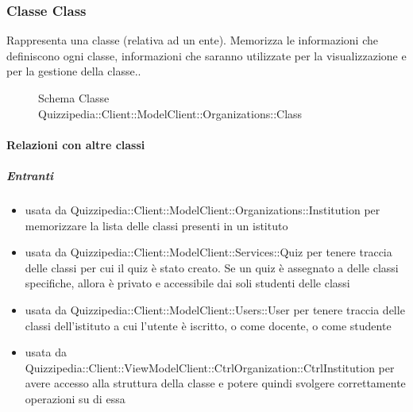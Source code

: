 \subsubsection{Classe Class}
Rappresenta una classe (relativa ad un ente). Memorizza le informazioni che definiscono ogni classe, informazioni che saranno utilizzate per la visualizzazione e per la gestione della classe..
\begin{figure}[H]
\centering
\noindent{}
\caption[Schema Classe Class]{Schema Classe Quizzipedia::Client::ModelClient::Organizations::Class}
\end{figure}
\paragraph{Relazioni con altre classi}
\subparagraph{Entranti}
\begin{itemize}
\item usata da Quizzipedia::Client::ModelClient::Organizations::Institution per memorizzare la lista delle classi presenti in un istituto
\item usata da Quizzipedia::Client::ModelClient::Services::Quiz per tenere traccia delle classi per cui il quiz è stato creato. Se un quiz è assegnato a delle classi specifiche, allora è privato e accessibile dai soli studenti delle classi
\item usata da Quizzipedia::Client::ModelClient::Users::User per tenere traccia delle classi dell'istituto a cui l'utente è iscritto, o come docente, o come studente
\item usata da Quizzipedia::Client::ViewModelClient::CtrlOrganization::CtrlInstitution per avere accesso alla struttura della classe e potere quindi svolgere correttamente operazioni su di essa
\end{itemize}
